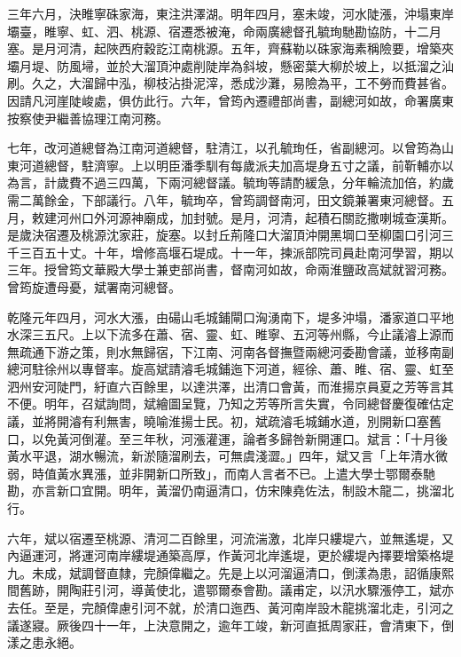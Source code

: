 \begin{pinyinscope}
三年六月，決睢寧硃家海，東注洪澤湖。明年四月，塞未竣，河水陡漲，沖塌東岸壩臺，睢寧、虹、泗、桃源、宿遷悉被淹，命兩廣總督孔毓珣馳勘協防，十二月塞。是月河清，起陜西府穀訖江南桃源。五年，齊蘇勒以硃家海素稱險要，增築夾壩月堤、防風埽，並於大溜頂沖處削陡岸為斜坡，懸密葉大柳於坡上，以抵溜之汕刷。久之，大溜歸中泓，柳枝沾掛泥滓，悉成沙灘，易險為平，工不勞而費甚省。因請凡河崖陡峻處，俱仿此行。六年，曾筠內遷禮部尚書，副總河如故，命署廣東按察使尹繼善協理江南河務。

七年，改河道總督為江南河道總督，駐清江，以孔毓珣任，省副總河。以曾筠為山東河道總督，駐濟寧。上以明臣潘季馴有每歲派夫加高堤身五寸之議，前靳輔亦以為言，計歲費不過三四萬，下兩河總督議。毓珣等請酌緩急，分年輪流加倍，約歲需二萬餘金，下部議行。八年，毓珣卒，曾筠調督南河，田文鏡兼署東河總督。五月，敕建河州口外河源神廟成，加封號。是月，河清，起積石關訖撒喇城查漢斯。是歲決宿遷及桃源沈家莊，旋塞。以封丘荊隆口大溜頂沖開黑堈口至柳園口引河三千三百五十丈。十年，增修高堰石堤成。十一年，揀派部院司員赴南河學習，期以三年。授曾筠文華殿大學士兼吏部尚書，督南河如故，命兩淮鹽政高斌就習河務。曾筠旋遭母憂，斌署南河總督。

乾隆元年四月，河水大漲，由碭山毛城鋪閘口洶湧南下，堤多沖塌，潘家道口平地水深三五尺。上以下流多在蕭、宿、靈、虹、睢寧、五河等州縣，今止議濬上源而無疏通下游之策，則水無歸宿，下江南、河南各督撫暨兩總河委勘會議，並移南副總河駐徐州以專督率。旋高斌請濬毛城鋪迤下河道，經徐、蕭、睢、宿、靈、虹至泗州安河陡門，紆直六百餘里，以達洪澤，出清口會黃，而淮揚京員夏之芳等言其不便。明年，召斌詢問，斌繪圖呈覽，乃知之芳等所言失實，令同總督慶復確估定議，並將開濬有利無害，曉喻淮揚士民。初，斌疏濬毛城鋪水道，別開新口塞舊口，以免黃河倒灌。至三年秋，河漲灌運，論者多歸咎新開運口。斌言：「十月後黃水平退，湖水暢流，新淤隨溜刷去，可無虞淺澀。」四年，斌又言「上年清水微弱，時值黃水異漲，並非開新口所致」，而南人言者不已。上遣大學士鄂爾泰馳勘，亦言新口宜開。明年，黃溜仍南逼清口，仿宋陳堯佐法，制設木龍二，挑溜北行。

六年，斌以宿遷至桃源、清河二百餘里，河流湍激，北岸只縷堤六，並無遙堤，又內逼運河，將運河南岸縷堤通築高厚，作黃河北岸遙堤，更於縷堤內擇要增築格堤九。未成，斌調督直隸，完顏偉繼之。先是上以河溜逼清口，倒漾為患，詔循康熙間舊跡，開陶莊引河，導黃使北，遣鄂爾泰會勘。議甫定，以汛水驟漲停工，斌亦去任。至是，完顏偉慮引河不就，於清口迤西、黃河南岸設木龍挑溜北走，引河之議遂寢。厥後四十一年，上決意開之，逾年工竣，新河直抵周家莊，會清東下，倒漾之患永絕。


\end{pinyinscope}
